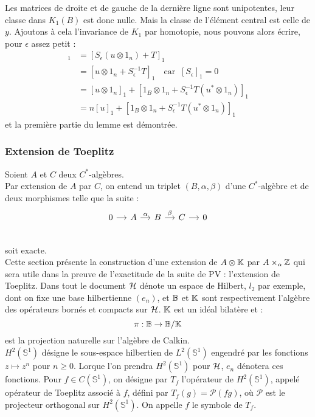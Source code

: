 \begin{dem}
Les matrices de droite et de gauche de la dernière ligne sont unipotentes, leur classe dans $K_1(B)$ est donc nulle. Mais la classe de l'élément central est celle de $y$. Ajoutons à cela l'invariance de $K_1$ par homotopie, nous pouvons alors écrire, pour $\epsilon$ assez petit :
\begin{align*}[y]_1 & =[S_\epsilon(u\otimes 1_n)+T]_1
	\\		&= [u\otimes 1_n +S_\epsilon^{-1}T]_1 \quad \text{car } \ [S_\epsilon]_1=0	
	\\ 		&=[u\otimes 1_n]_1+[1_B\otimes 1_n +S_\epsilon^{-1}T(u^*\otimes 1_n)]_1
	\\		&=n[u]_1+[1_B\otimes 1_n +S_\epsilon^{-1}T(u^*\otimes 1_n)]_1
\end{align*}
et la première partie du lemme est démontrée.\\


\end{dem}

\subsubsection{Extension de Toeplitz}


Soient $A$ et $C$ deux $C^*$-algèbres. \\
Par extension de $A$ par $C$, on entend un triplet $(B,\alpha,\beta)$ d'une $C^*$-algèbre et de deux morphismes telle que la suite :
\[\begin{tikzcd}[column sep =small] 
0 \arrow{r}  & A \arrow{r}{\alpha}  &  B \arrow{r}{\beta}  & C \arrow{r}& 0 \\ 
\end{tikzcd}\]
soit exacte.\\

Cette section présente la construction d'une extension de $A\otimes \mathbb K$ par $A\times_\alpha \mathbb Z$ qui sera utile dans la preuve de l'exactitude de la suite de PV : l'extension de Toeplitz. Dans tout le document $\mathcal H$ dénote un espace de Hilbert, $l_2$ par exemple, dont on fixe une base hilbertienne $(e_n)$, et $\mathbb B$ et $\mathbb K$ sont respectivement l'algèbre des opérateurs bornés et compacts sur $\mathcal H$. $\mathbb K$ est un idéal bilatère et :
\[\pi : \mathbb B \rightarrow \mathbb B / \mathbb K\]
est la projection naturelle sur l'algèbre de Calkin. \\
$H^2(\mathbb S^1)$ désigne le sous-espace hilbertien de $L^2(\mathbb S ^1)$ engendré par les fonctions $z \mapsto z^n$ pour $n\geq 0$. Lorque l'on prendra $H^2(\mathbb S^1)$ pour $\mathcal H$, $e_n$ dénotera ces fonctions. Pour $f\in C(\mathbb S^1)$, on désigne par $T_f$ l'opérateur de $H^2(\mathbb S^1)$, appelé opérateur de Toeplitz associé à $f$, défini par $T_f(g)=\mathcal P(fg)$, où $\mathcal P$ est le projecteur orthogonal sur $H^2(\mathbb S^1)$. On appelle $f$ le symbole de $T_f$.\\

